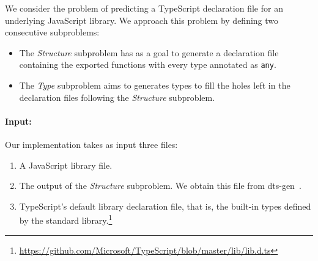 \documentclass[sigplan,10pt,review,anonymous]{acmart} %
\theoremstyle{plain}
\theoremstyle{remark}
\theoremstyle{definition}
\begin{document}
We consider the problem of predicting a TypeScript declaration file
for an underlying JavaScript library. We approach this problem by defining
two consecutive subproblems:
\begin{itemize}[label=\raisebox{0.25ex}{\tiny$\bullet$}]
  \item The \textit{Structure} subproblem 
  has as a goal to generate a declaration file containing the exported functions with every type annotated as \texttt{any}.
  \item The \textit{Type} subproblem aims to generates types
  to fill the holes left in the declaration files
  following the \textit{Structure} subproblem.
\end{itemize}

\paragraph{Input:}
Our implementation takes as input three files:
\begin{enumerate}
	\item A JavaScript library file.
	\item The output of the \textit{Structure} subproblem.
	      We obtain this file from dts-gen~\cite{dtsgen}.
	\item TypeScript's default library declaration file,
	      that is, the built-in types defined by the standard library.\footnote{\url{https://github.com/Microsoft/TypeScript/blob/master/lib/lib.d.ts}}
\end{enumerate}
%
\end{document}
